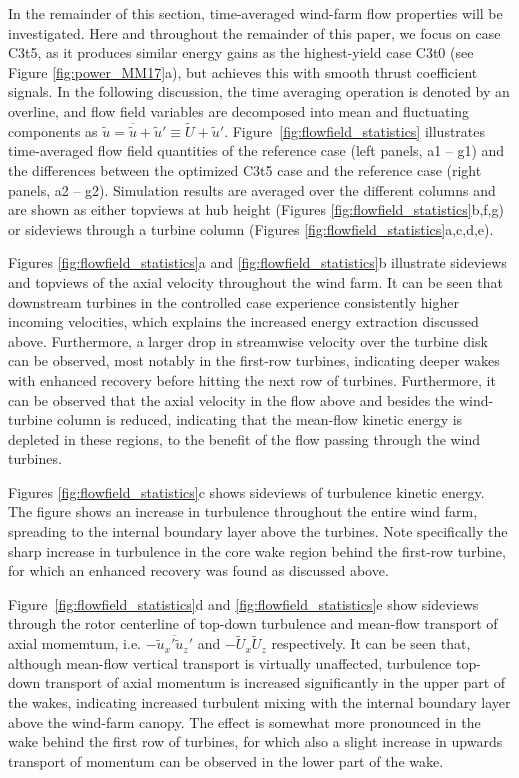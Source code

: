 \documentclass[wes, manuscript]{copernicus}
\begin{document}
In the remainder of this section, time-averaged wind-farm flow properties will be investigated. Here and throughout the remainder of this paper, we focus on case C3t5, as it produces similar energy gains as the highest-yield case C3t0 (see Figure \ref{fig:power_MM17}a), but achieves this with smooth thrust coefficient signals. In the following discussion, the time averaging operation is denoted by an overline, and flow field variables are decomposed into mean and fluctuating components as $\widetilde{u} = \overline{\widetilde{u}} + \widetilde{u}' \equiv \widetilde{U} + \widetilde{u}'  $. Figure~\ref{fig:flowfield_statistics} illustrates time-averaged flow field quantities of the reference case (left panels, a1 -- g1) and the differences between the optimized C3t5 case and the reference case (right panels, a2 -- g2). Simulation results are averaged over the different columns and are shown as either topviews at hub height (Figures \ref{fig:flowfield_statistics}b,f,g) or sideviews through a turbine column (Figures \ref{fig:flowfield_statistics}a,c,d,e). 

Figures \ref{fig:flowfield_statistics}a and \ref{fig:flowfield_statistics}b illustrate sideviews and topviews of the axial velocity throughout the wind farm. It can be seen that downstream turbines in the controlled case experience consistently higher incoming velocities, which explains the increased energy extraction discussed above. Furthermore, a larger drop in streamwise velocity over the turbine disk can be observed, most notably in the first-row turbines, indicating deeper wakes with enhanced recovery before hitting the next row of turbines. Furthermore, it can be observed that the axial velocity in the flow above and besides the wind-turbine column is reduced, indicating that the mean-flow kinetic energy is depleted in these regions, to the benefit of the flow passing through the wind turbines. 

Figures \ref{fig:flowfield_statistics}c shows sideviews of turbulence kinetic energy. The figure shows an increase in turbulence throughout the entire wind farm, spreading to the internal boundary layer above the turbines. Note specifically the sharp increase in turbulence in the core wake region behind the first-row turbine, for which an enhanced recovery was found as discussed above. 

Figure~\ref{fig:flowfield_statistics}d and \ref{fig:flowfield_statistics}e show sideviews through the rotor centerline of top-down turbulence and mean-flow transport of axial momemtum, i.e. $-\overline{\widetilde{u}_x' \widetilde{u}_z'}$ and $- \widetilde{U}_x \widetilde{U}_z$ respectively. It can be seen that, although mean-flow vertical transport is virtually unaffected, turbulence top-down transport of axial momentum is increased significantly in the upper part of the wakes, indicating increased turbulent mixing with the internal boundary layer above the wind-farm canopy. The effect is somewhat more pronounced in the wake behind the first row of turbines, for which also a slight increase in upwards transport of momentum can be observed in the lower part of the wake. 
\end{document}
